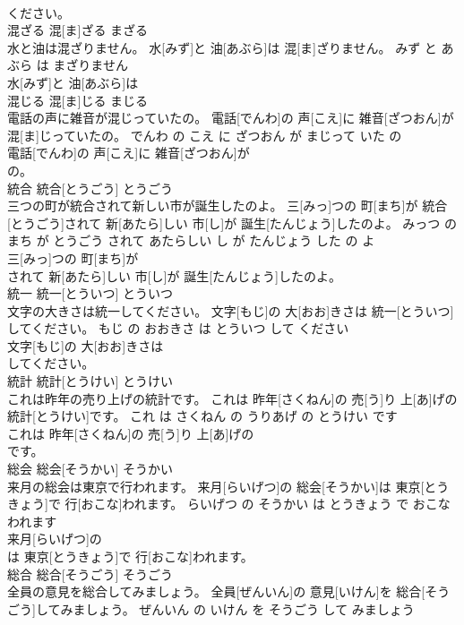 \documentclass[8pt]{extreport}
\begin{document}
\begin{CJK}{UTF8}{min}
\\	ください。			
\\	混ざる	混[ま]ざる	まざる	
\\	水と油は混ざりません。	水[みず]と 油[あぶら]は 混[ま]ざりません。	みず と あぶら は まざりません	
\\	水[みず]と 油[あぶら]は
\\	混じる	混[ま]じる	まじる	
\\	電話の声に雑音が混じっていたの。	電話[でんわ]の 声[こえ]に 雑音[ざつおん]が 混[ま]じっていたの。	でんわ の こえ に ざつおん が まじって いた の	
\\	電話[でんわ]の 声[こえ]に 雑音[ざつおん]が
\\	の。			
\\	統合	統合[とうごう]	とうごう	
\\	三つの町が統合されて新しい市が誕生したのよ。	三[みっ]つの 町[まち]が 統合[とうごう]されて 新[あたら]しい 市[し]が 誕生[たんじょう]したのよ。	みっつ の まち が とうごう されて あたらしい し が たんじょう した の よ	
\\	三[みっ]つの 町[まち]が
\\	されて 新[あたら]しい 市[し]が 誕生[たんじょう]したのよ。			
\\	統一	統一[とういつ]	とういつ	
\\	文字の大きさは統一してください。	文字[もじ]の 大[おお]きさは 統一[とういつ]してください。	もじ の おおきさ は とういつ して ください	
\\	文字[もじ]の 大[おお]きさは
\\	してください。			
\\	統計	統計[とうけい]	とうけい	
\\	これは昨年の売り上げの統計です。	これは 昨年[さくねん]の 売[う]り 上[あ]げの 統計[とうけい]です。	これ は さくねん の うりあげ の とうけい です	
\\	これは 昨年[さくねん]の 売[う]り 上[あ]げの
\\	です。			
\\	総会	総会[そうかい]	そうかい	
\\	来月の総会は東京で行われます。	来月[らいげつ]の 総会[そうかい]は 東京[とうきょう]で 行[おこな]われます。	らいげつ の そうかい は とうきょう で おこなわれます	
\\	来月[らいげつ]の
\\	は 東京[とうきょう]で 行[おこな]われます。			
\\	総合	総合[そうごう]	そうごう	
\\	全員の意見を総合してみましょう。	全員[ぜんいん]の 意見[いけん]を 総合[そうごう]してみましょう。	ぜんいん の いけん を そうごう して みましょう	

\end{CJK}
\end{document}
